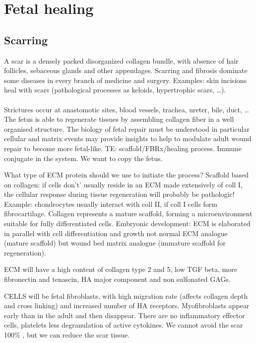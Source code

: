 \graphicspath{{chapters/scarring/}}
\chapter{Fetal healing}

\section{Scarring}
A scar is a densely packed disorganized collagen bundle, with absence of hair follicles, sebaceous glands and other appendages. 
Scarring and fibrosis dominate some diseases in every branch of medicine and surgery.
Examples: skin incisions heal with scars (pathological processes as keloids, hypertrophic scars, …).
\\
\\
\noindent
Strictures occur at anastomotic sites, blood vessels, trachea, ureter, bile, duct, … 
The fetus is able to regenerate tissues by assembling collagen fiber in a well organised structure.
The biology of fetal repair must be understood in particular cellular and matrix events may provide insights to help to modulate adult wound repair to become more fetal-like.
TE: scaffold/FBRx/healing process. Immune conjugate in the system. We want to copy the fetus.

What type of ECM protein should we use to initiate the process?
Scaffold based on collagen: if cells don't’ usually reside in an ECM made extensively of coll I, the cellular response during tissue regeneration will probably be pathologic! 
Example: chondrocytes usually interact with coll II, if coll I cells form fibrocartilage. 
Collagen represents a mature scaffold, forming a microenvironment suitable for fully differentiated cells.
Embryonic development: ECM is elaborated in parallel with cell differentiation and growth not normal ECM analogue (mature scaffold) but wound bed matrix analogue (immature scaffold for regeneration).

ECM will have a high content of collagen type 2 and 5, low TGF beta, more fibronectin and tenascin, HA major component and non sulfonated GAGs.

CELLS will be fetal fibroblasts, with high migration rate (affects collagen depth and cross linking)
and increased number of HA receptors. Myofibroblasts appear early than in the adult and then disappear. There are no inflammatory effector cells, platelets less degranulation of active cytokines. We cannot avoid the scar 100\% , but we can reduce the scar tissue.

